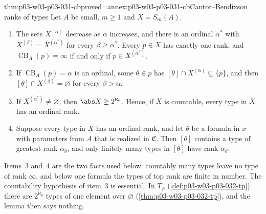 \begin{hblemma}{thm:p03-w03-p03-031-cb}{proved=annex:p03-w03-p03-031-cb}{Cantor--Bendixson ranks of types}
Let \(A\) be small, \(m\geq1\) and \(X=S_m(A)\).
\begin{enumerate}
  \item The sets \(X^{(\alpha)}\) decrease as \(\alpha\) increases, and
        there is an ordinal \(\alpha^*\) with
        \(X^{(\beta)}=X^{(\alpha^*)}\) for every \(\beta\geq\alpha^*\).
        Every \(p\in X\) has exactly one rank, and
        \(\operatorname{CB}_A(p)=\infty\) if and only if
        \(p\in X^{(\alpha^*)}\).
  \item If \(\operatorname{CB}_A(p)=\alpha\) is an ordinal, some
        \(\theta\in p\) has \([\theta]\cap X^{(\alpha)}\subseteq\{p\}\), and
        then \([\theta]\cap X^{(\beta)}=\varnothing\) for every
        \(\beta>\alpha\).
  \item If \(X^{(\alpha^*)}\neq\varnothing\), then
        \(\abs X\geq2^{\aleph_0}\).  Hence, if \(X\) is countable, every
        type in \(X\) has an ordinal rank.
  \item Suppose every type in \(X\) has an ordinal rank, and let \(\theta\)
        be a formula in \(x\) with parameters from \(A\) that is realized in
        \(\mathfrak C\).  Then \([\theta]\) contains a type of greatest rank
        \(\alpha_\theta\), and only finitely many types in \([\theta]\) have
        rank \(\alpha_\theta\).
\end{enumerate}
\end{hblemma}

Items~3 and~4 are the two facts used below: countably many types leave no
type of rank \(\infty\), and below one formula the types of top rank are
finite in number.  The countability hypothesis of item~3 is essential.  In
\(T_P\) (\cref{def:p03-w03-p03-032-tp}) there are \(2^{\aleph_0}\) types of
one element over \(\varnothing\) (\cref{thm:p03-w03-p03-032-tp}), and the
lemma then says nothing.

